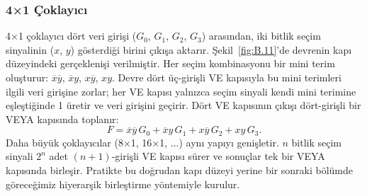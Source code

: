 \subsubsection{4×1 Çoklayıcı}
4×1 çoklayıcı dört veri girişi ($G_0$, $G_1$, $G_2$, $G_3$) arasından, iki bitlik seçim sinyalinin ($x$, $y$) gösterdiği birini çıkışa aktarır. Şekil~\ref{fig:B.11}'de devrenin kapı düzeyindeki gerçeklenişi verilmiştir. Her seçim kombinasyonu bir mini terim oluşturur: $\overline{x}\overline{y}$, $\overline{x}y$, $x\overline{y}$, $xy$. Devre dört üç-girişli VE kapısıyla bu mini terimleri ilgili veri girişine zorlar; her VE kapısı yalnızca seçim sinyali kendi mini terimine eşleştiğinde 1 üretir ve veri girişini geçirir. Dört VE kapısının çıkışı dört-girişli bir VEYA kapısında toplanır:
\[ F = \overline{x}\overline{y}\,G_0 + \overline{x}y\,G_1 + x\overline{y}\,G_2 + xy\,G_3. \]
Daha büyük çoklayıcılar (8×1, 16×1, ...) aynı yapıyı genişletir. $n$ bitlik seçim sinyali $2^n$ adet $(n{+}1)$-girişli VE kapısı sürer ve sonuçlar tek bir VEYA kapısında birleşir. Pratikte bu doğrudan kapı düzeyi yerine bir sonraki bölümde göreceğimiz hiyerarşik birleştirme yöntemiyle kurulur.

